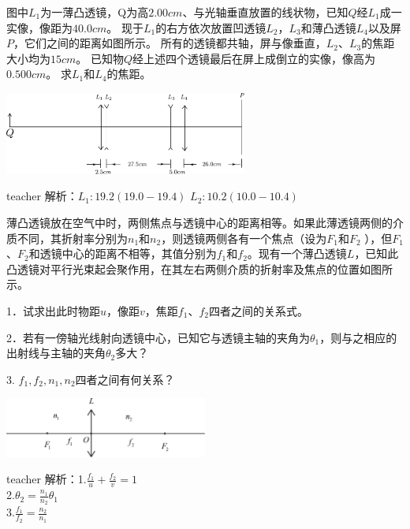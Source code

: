 \begin{example}
图中$L_1$为一薄凸透镜，Q为高$2.00\unit{cm}$、与光轴垂直放置的线状物，已知$Q$经$L_1$成一实像，像距为$40.0\unit{cm}$。
现于$L_1$的右方依次放置凹透镜$L_2$，$L_3$和薄凸透镜$L_4$以及屏$P$，它们之间的距离如图所示。
所有的透镜都共轴，屏与像垂直，$L_2$、$L_3$的焦距大小均为$15\unit{cm}$。
已知物$Q$经上述四个透镜最后在屏上成倒立的实像，像高为$0.500\unit{cm}$。
求$L_1$和$L_4$的焦距。
\begin{flushright}
\includegraphics[width=0.6\textwidth]{images/lense-group-problem.pdf}
\end{flushright}
\begin{taggedblock}{teacher}
\noindent
解析：$L_1:19.2(19.0-19.4)$  $L_2:10.2(10.0-10.4)$
\end{taggedblock}
\end{example}



\begin{example}
	薄凸透镜放在空气中时，两侧焦点与透镜中心的距离相等。如果此薄透镜两侧的介质不同，其折射率分别为$n_1$和$n_2$，则透镜两侧各有一个焦点（设为$F_1$和$F_2$ ），但$F_1$、$F_2$和透镜中心的距离不相等，其值分别为$f_1$和$f_2 $。现有一个薄凸透镜$L$，已知此凸透镜对平行光束起会聚作用，在其左右两侧介质的折射率及焦点的位置如图所示。 
	
	1．试求出此时物距$u$，像距$v$，焦距$f_1$、$f_2 $四者之间的关系式。 
	
	2．若有一傍轴光线射向透镜中心，已知它与透镜主轴的夹角为$\theta_1$，则与之相应的出射线与主轴的夹角$\theta_2$多大？ 
	
	3. $f_1,f_2,n_1,n_2$四者之间有何关系？
	
		\begin{flushright}
			\includegraphics[width = 0.5\textwidth]{images/opt-14.pdf} 
		\end{flushright}
	\begin{taggedblock}{teacher}
		\noindent
		解析：1.$\frac{f_1}{u}+\frac{f_2}{v}=1$
		\\2.$\theta_2=\frac{n_1}{n_2}\theta_1$
		\\3.$\frac{f_1}{f_2}=\frac{n_2}{n_1}$
	\end{taggedblock}
\end{example}

